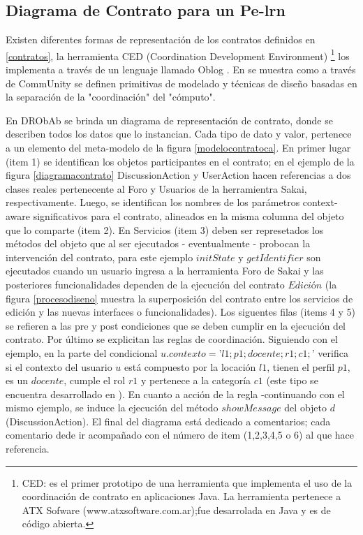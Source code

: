 \documentclass{llncs}
\begin{document}
\subsection{Diagrama de Contrato para un Pe-lrn}

Existen diferentes formas de representación de los contratos definidos en \ref{contratos}, la herramienta  CED (Coordination Development Environment) \footnote{CED: es el primer prototipo de una herramienta que implementa el uso de la coordinación de contrato en aplicaciones Java. La herramienta pertenece a ATX Sofware (www.atxsoftware.com.ar);fue desarrolada en Java y es de código abierta.} los implementa a través de un lenguaje llamado Oblog \cite{lenguajeoblog}. En \cite{communit} se muestra como a través de CommUnity se definen primitivas de modelado y técnicas de diseño basadas en la separación de la "coordinación" del "cómputo". 

En DRObAb se brinda un diagrama de representación de contrato, donde se describen todos los datos que lo instancian. Cada tipo de dato y valor, pertenece a un elemento del meta-modelo de la figura \ref{modelocontratoca}. En primer lugar (item 1) se identifican los objetos participantes en el contrato; en el ejemplo de la figura \ref{diagramacontrato} DiscussionAction y UserAction hacen referencias a dos clases reales pertenecente al Foro y Usuarios de la herramientra Sakai, respectivamente. Luego, se identifican los nombres de los parámetros context-aware significativos para el contrato, alineados en la misma columna del objeto que lo comparte (item 2). En Servicios (item 3) deben ser represetados los métodos del objeto que al ser ejecutados - eventualmente -  probocan la intervención del contrato, para este ejemplo $initState$ y $getIdentifier$  son ejecutados cuando un usuario ingresa a la herramienta Foro de Sakai y las posteriores funcionalidades dependen de la ejecución del contrato $Edición$ (la figura \ref{procesodiseno} muestra la superposición del contrato entre los servicios de edición y las nuevas interfaces o funcionalidades). Los siguentes filas (items 4 y 5) se refieren a las pre y post condiciones que se deben cumplir en la ejecución del contrato. Por último se explicitan las reglas de coordinación. Siguiendo con el ejemplo, en la parte del condicional $u.contexto=’l1;p1;docente;r1;c1;’$ verifica si el contexto del usuario $u$ está compuesto por la locación $l1$, tienen el perfil $p1$, es un $docente$, cumple el rol $r1$ y pertenece a la categoría $c1$ (este tipo se encuentra desarrollado en \cite{libro}). En cuanto a acción de la regla -continuando con el mismo ejemplo, se induce la ejecución del método $showMessage$ del objeto $d$ (DiscussionAction). El final del diagrama está dedicado a comentarios; cada comentario dede ir acompañado con el número de item (1,2,3,4,5 o 6) al que hace referencia. 
\end{document}

